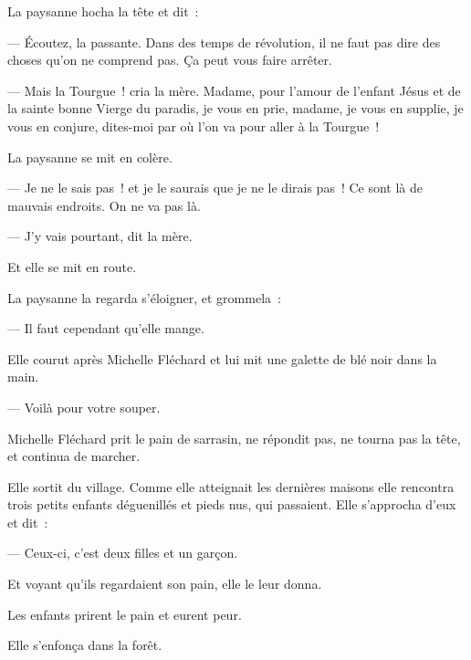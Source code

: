 \documentclass[french,twoside]{book} %
\begin{document}
La paysanne hocha la tête et dit :\par
— Écoutez, la passante. Dans des temps de révolution, il ne faut pas dire des choses qu’on ne comprend pas. Ça peut vous faire arrêter.\par
— Mais la Tourgue ! cria la mère. Madame, pour l’amour de l’enfant Jésus et de la sainte bonne Vierge du paradis, je vous en prie, madame, je vous en supplie, je vous en conjure, dites-moi par où l’on va pour aller à la Tourgue !\par
La paysanne se mit en colère.\par
— Je ne le sais pas ! et je le saurais que je ne le dirais pas ! Ce sont là de mauvais endroits. On ne va pas là.\par
— J’y vais pourtant, dit la mère.\par
Et elle se mit en route.\par
La paysanne la regarda s’éloigner, et grommela :\par
 — Il faut cependant qu’elle mange.\par
Elle courut après Michelle Fléchard et lui mit une galette de blé noir dans la main.\par
— Voilà pour votre souper.\par
Michelle Fléchard prit le pain de sarrasin, ne répondit pas, ne tourna pas la tête, et continua de marcher.\par
Elle sortit du village. Comme elle atteignait les dernières maisons elle rencontra trois petits enfants déguenillés et pieds nus, qui passaient. Elle s’approcha d’eux et dit :\par
— Ceux-ci, c’est deux filles et un garçon.\par
Et voyant qu’ils regardaient son pain, elle le leur donna.\par
Les enfants prirent le pain et eurent peur.\par
Elle s’enfonça dans la forêt.
\end{document}
